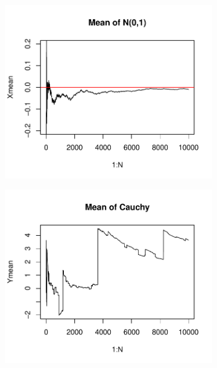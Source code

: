 \begin{figure}[H]
    \begin{minipage}{0.5\textwidth}
    \begin{center}
        \begin{figure}[H]
            \includegraphics[scale=0.7]{ch3_3.9A.pdf}
        \end{figure}
    \end{center}
    \end{minipage}
    \begin{minipage}{0.5\textwidth}
    \begin{center}
        \begin{figure}[H]
            \includegraphics[scale=0.7]{ch3_3.9B.pdf}
        \end{figure}
    \end{center}
    \end{minipage}
\end{figure}

